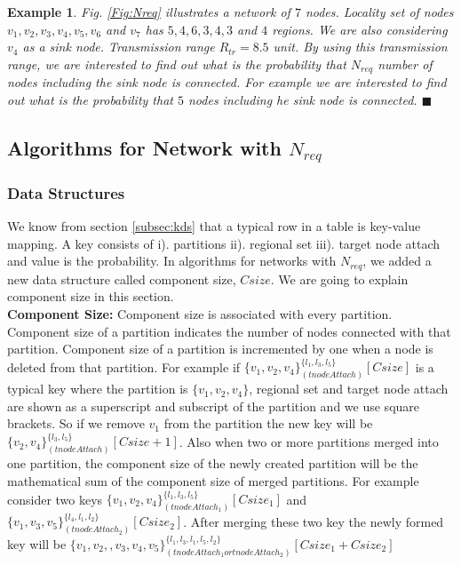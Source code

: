 \documentclass[12pt]{article}
\newtheorem{exmp}{Example}[section]
\begin{document}
\begin{exmp}
\normalfont
Fig. \ref{Fig:Nreq} illustrates a network of $7$ nodes. Locality set of nodes $v_1,v_2,v_3,v_4,v_5,v_6$ and $v_7$ has $5,4,6,3,4,3$ and $4$ regions. We are also considering $v_4$ as a sink node. Transmission range \(R_{tr}=8.5\) unit. By using this transmission range, we are interested to find out what is the probability that $N_{req}$ number of nodes including the sink node is connected. For example we are interested to find out what is the probability that $5$ nodes including he sink node is connected. $\blacksquare$
\end{exmp}

\subsection{Algorithms for Network with $N_{req}$}
\subsubsection{Data Structures}
We know from section \ref{subsec:kds} that a typical row in a table is key-value mapping. A key consists of 
i). partitions ii). regional set iii). target node attach and value is the probability. In algorithms for networks with $N_{req}$, we added a new data structure called component size, $Csize$. We are going to explain component size in this section.\\
\textbf{Component Size:} Component size is associated with every partition. Component size of a partition indicates the number of nodes connected with  that partition. Component size of a partition is incremented by one when a node is deleted from that partition. For example if ${\{v_1,v_2,v_4\}}^{\{l_1,l_3,l_5\}}_{(tnodeAttach)} [Csize]$ is a typical key where the partition is $\{v_1,v_2,v_4\}$, regional set and target node attach are shown as a superscript and subscript of the partition and we use square brackets. So if we remove   $v_1$ from the partition the new key will be ${\{v_2,v_4\}}^{\{l_3,l_5\}}_{(tnodeAttach)} [Csize+1]$.    Also when two or more partitions merged into one partition, the component size of the newly created partition will be the mathematical sum of the component size of merged partitions. For example consider two  keys ${\{v_1,v_2,v_4\}}^{\{l_1,l_3,l_5\}}_{(tnodeAttach_1)} [Csize_1]$ and ${\{v_1,v_3,v_5\}}^{\{l_4,l_1,l_2\}}_{(tnodeAttach_2)} [Csize_2]$. After merging these two key the newly formed key will be ${\{v_1,v_2,,v_3,v_4,v_5\}}^{\{l_1,l_3,l_1,l_5,l_2\}}_{(tnodeAttach_1 or tnodeAttach_2)} [Csize_1+Csize_2]$
\end{document}

